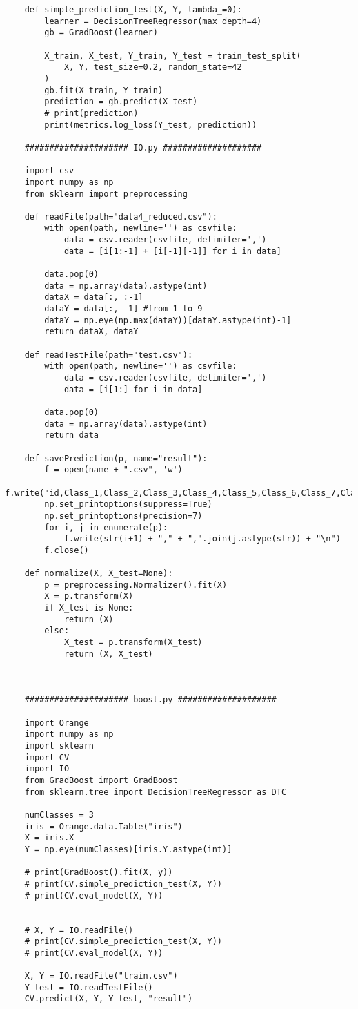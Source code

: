 \documentclass[a4paper,11pt]{article}
\begin{document}
\begin{lstlisting}
    def simple_prediction_test(X, Y, lambda_=0):
        learner = DecisionTreeRegressor(max_depth=4)
        gb = GradBoost(learner)

        X_train, X_test, Y_train, Y_test = train_test_split(
            X, Y, test_size=0.2, random_state=42
        )
        gb.fit(X_train, Y_train)
        prediction = gb.predict(X_test)
        # print(prediction)
        print(metrics.log_loss(Y_test, prediction))

    ##################### IO.py ####################

    import csv
    import numpy as np
    from sklearn import preprocessing

    def readFile(path="data4_reduced.csv"):
        with open(path, newline='') as csvfile:
            data = csv.reader(csvfile, delimiter=',')
            data = [i[1:-1] + [i[-1][-1]] for i in data]

        data.pop(0)
        data = np.array(data).astype(int)
        dataX = data[:, :-1]
        dataY = data[:, -1] #from 1 to 9
        dataY = np.eye(np.max(dataY))[dataY.astype(int)-1]
        return dataX, dataY

    def readTestFile(path="test.csv"):
        with open(path, newline='') as csvfile:
            data = csv.reader(csvfile, delimiter=',')
            data = [i[1:] for i in data]

        data.pop(0)
        data = np.array(data).astype(int)
        return data

    def savePrediction(p, name="result"):
        f = open(name + ".csv", 'w')
        f.write("id,Class_1,Class_2,Class_3,Class_4,Class_5,Class_6,Class_7,Class_8,Class_9\n")
        np.set_printoptions(suppress=True)
        np.set_printoptions(precision=7)
        for i, j in enumerate(p):
            f.write(str(i+1) + "," + ",".join(j.astype(str)) + "\n")
        f.close()

    def normalize(X, X_test=None):
        p = preprocessing.Normalizer().fit(X)
        X = p.transform(X)
        if X_test is None:
            return (X)
        else:
            X_test = p.transform(X_test)
            return (X, X_test)



    ##################### boost.py ####################

    import Orange
    import numpy as np
    import sklearn
    import CV
    import IO
    from GradBoost import GradBoost
    from sklearn.tree import DecisionTreeRegressor as DTC

    numClasses = 3
    iris = Orange.data.Table("iris")
    X = iris.X
    Y = np.eye(numClasses)[iris.Y.astype(int)]

    # print(GradBoost().fit(X, y))
    # print(CV.simple_prediction_test(X, Y))
    # print(CV.eval_model(X, Y))


    # X, Y = IO.readFile()
    # print(CV.simple_prediction_test(X, Y))
    # print(CV.eval_model(X, Y))

    X, Y = IO.readFile("train.csv")
    Y_test = IO.readTestFile()
    CV.predict(X, Y, Y_test, "result")

\end{lstlisting}
\end{document}

